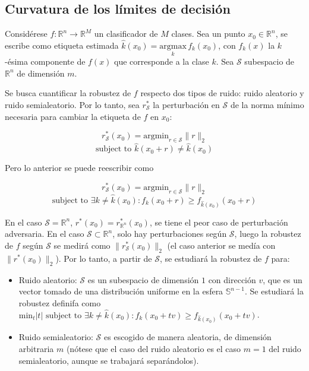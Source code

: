 \subsection{Curvatura de los límites de decisión}
Considérese $f: \mathbb{R}^n \to \mathbb{R}^M$ un clasificador de $M$ clases. Sea un punto $x_0 \in \mathbb{R}^n$, se escribe como etiqueta estimada $\widehat{k}(x_0) = \underset{k}{\mathrm{argmax}} \, f_k(x_0)$, con $f_k(x)$ la $k$-ésima componente de $f(x)$ que corresponde a la clase $k$. Sea $\mathcal{S}$ subespacio de $\mathbb{R}^n$ de dimensión $m$.

Se busca cuantificar la robustez de $f$ respecto dos tipos de ruido: ruido aleatorio y ruido semialeatorio. Por lo tanto, sea $r_\mathcal{S}^*$ la perturbación en $\mathcal{S}$ de la norma mínimo necesaria para cambiar la etiqueta de $f$ en $x_0$:

$$r_\mathcal{S}^*(x_0) = \text{argmin}_{r \in \mathcal{S}} \|r \|_2$$
$$\text{subject to } \widehat{k}(x_0+r) \neq \widehat{k}(x_0)$$

Pero lo anterior se puede reescribir como

$$r_\mathcal{S}^*(x_0)=\text{argmin}_{r \in \mathcal{S}} \|r \|_2$$
$$\text{subject to } \exists k \neq \widehat{k}(x_0): f_k(x_0 + r) \geq f_{\widehat{k}(x_0)}(x_0 + r)$$

En el caso $\mathcal{S}=\mathbb{R}^n$, $r^*(x_0)=r_{\mathbb{R}^n}^*(x_0)$, se tiene el peor caso de perturbación adversaria. En el caso $\mathcal{S} \subset \mathbb{R}^n$, solo hay perturbaciones según $\mathcal{S}$, luego la robustez de $f$ según $\mathcal{S}$ se medirá como $\|r_{\mathcal{S}}^*(x_0) \|_2$ (el caso anterior se medía con $\|r^*(x_0) \|_2$). Por lo tanto, a partir de  $\mathcal{S}$, se estudiará la robustez de $f$ para:

\begin{itemize}
	\item Ruido aleatorio: $\mathcal{S}$ es un subespacio de dimensión $1$ con dirección $v$, que es un vector tomado de una distribución uniforme en la esfera $\mathbb{S}^{n-1}$. Se estudiará la robustez definifa como $\text{min}_t |t| \text{ subject to } \exists k \neq \widehat{k}(x_0): f_k(x_0 + tv) \geq f_{\widehat{k}(x_0)}(x_0 + tv)$.
	\item Ruido semialeatorio: $\mathcal{S}$ es escogido de manera aleatoria, de dimensión arbitraria $m$ (nótese que el caso del ruido aleatorio es el caso $m=1$ del ruido semialeatorio, aunque se trabajará separándolos).
\end{itemize}

